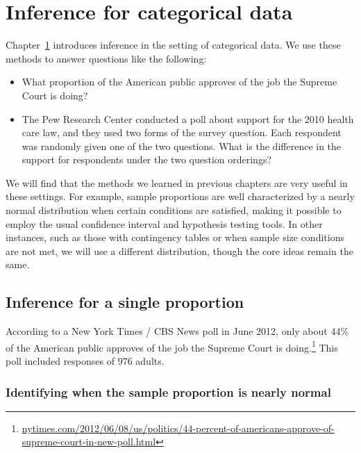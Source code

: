 
\chapter{Inference for categorical data}
\label{inferenceForCategoricalData}

Chapter~\ref{inferenceForCategoricalData} introduces inference in the setting of categorical data. We use these methods to answer questions like the following:
\begin{itemize}
\setlength{\itemsep}{0mm}
\item What proportion of the American public approves of the job the Supreme Court is doing?
\item The Pew Research Center conducted a poll about support for the 2010 health care law, and they used two forms of the survey question. Each respondent was randomly given one of the two questions. What is the difference in the support for respondents under the two question orderings?
\end{itemize}
We will find that the methods we learned in previous chapters are very useful in these settings. For example, sample proportions are well characterized by a nearly normal distribution when certain conditions are satisfied, making it possible to employ the usual confidence interval and hypothesis testing tools. In other instances, such as those with contingency tables or when sample size conditions are not met, we will use a different distribution, though the core ideas remain the same.


\section{Inference for a single proportion}
\label{singleProportion}



According to a New York Times / CBS News poll in June 2012, only about 44\% of the American public approves of the job the Supreme Court is doing.\footnote{\href{http://www.nytimes.com/2012/06/08/us/politics/44-percent-of-americans-approve-of-supreme-court-in-new-poll.html}{\scriptsize nytimes.com/2012/06/08/us/politics/44-percent-of-americans-approve-of-supreme-court-in-new-poll.html}} This poll included responses of 976 adults.


\subsection{Identifying when the sample proportion is nearly normal}

